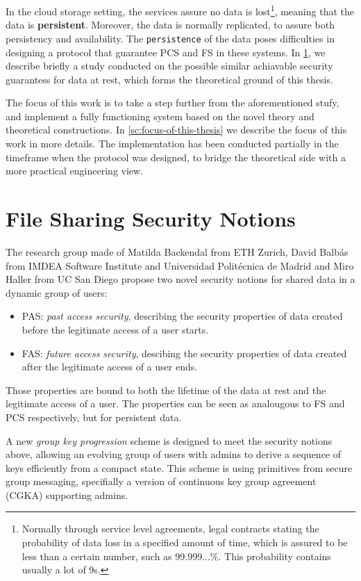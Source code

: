 In the cloud storage setting, the services assure no data is lost\footnote{Normally through service level agreements, legal contracts stating the probability of data loss in a specified amount of time, which is assured to be less than a certain number, such as 99.999...\%. This probability contains usually a lot of 9s.},
meaning that the data is \textbf{persistent}. 
Moreover, the data is normally replicated, to assure both persistency and availability.
The \texttt{persistence} of the data poses difficulties in designing a protocol that guarantee PCS and FS in these systems.
In \cref{sc:file-sharing-security-notions}, we describe briefly a study conducted on the possible similar achiavable security guarantess for data at rest, which forms the theoretical ground of this thesis.

The focus of this work is to take a step further from the aforementioned stufy, 
and implement a fully functioning system based on the novel theory and theoretical constructions.
In \cref{sc:focus-of-this-thesis} we describe the focus of this work in more details.
The implementation has been conducted partially in the timeframe when the protocol was designed, to bridge the theoretical side with a more practical engineering view.


\section{File Sharing Security Notions}\label{sc:file-sharing-security-notions}

The research group made of Matilda Backendal from ETH Zurich,
David Balb{\'a}s from IMDEA Software Institute and Universidad Polit{\'e}cnica de Madrid 
and Miro Haller from UC San Diego propose two novel security notions for shared data in
a dynamic group of users: 
\begin{itemize}
    \item PAS: \textit{past access security}, describing the security properties of data created before the legitimate access of a user starts.
    \item FAS: \textit{future access security}, descibing the security properties of data created after the legitimate access of a user ends.
\end{itemize}
Those properties are bound to both the lifetime of the data at rest and the legitimate access of a user.
The properties can be seen as analougous to FS and PCS respectively, but for persistent data.

A new \textit{group key progression} scheme is designed to meet the security notions above,
allowing an evolving group of users with admins to derive a sequence of keys efficiently from a compact state. 
This scheme is using primitives from secure group messaging, 
specifially a version of continuous key group agreement (CGKA) supporting admins.\cite{USENIX:BalColVau23}


